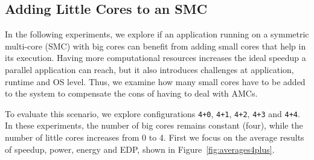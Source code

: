 

\subsection{Adding Little Cores to an SMC}

In the following experiments, we explore if an application running on a symmetric multi-core (SMC) with big cores can benefit from adding small cores that help in its execution. Having more computational resources increases the ideal speedup a parallel application can reach, but it also introduces challenges at application, runtime and OS level. 
Thus, we examine how many small cores have to be added to the system to compensate the cons of having to deal with AMCs.

To evaluate this scenario, we explore configurations \texttt{4+0}, \texttt{4+1}, \texttt{4+2}, \texttt{4+3} and \texttt{4+4}. In these experiments, the number of big cores remains constant (four), while the number of little cores increases from 0 to 4. First we focus on the average results of speedup, power, energy and EDP, shown in Figure~\ref{fig:averages4plus}.

